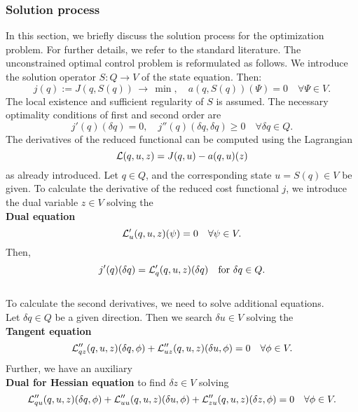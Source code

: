 {\subsubsection{Solution process}
In this section, we briefly discuss the solution process for the 
optimization problem. For further details, we refer to the standard literature.
The unconstrained optimal control problem is reformulated as follows. 
We introduce the solution operator $S:Q\rightarrow V$ of the state equation.
Then:
\begin{equation*}
j(q):= J(q,S(q))\, \rightarrow \, \min , \quad a(q,S(q))(\Psi) = 0 \quad 
\forall \Psi \in V.
\end{equation*}
The local existence and sufficient regularity of $S$ is assumed. The 
necessary optimality conditions of first and second order are
\begin{equation*}
j'(q)(\delta q) = 0 , \quad j''(q)(\delta q,\delta q) \geq 0 \quad 
\forall\delta q\in Q.
\end{equation*} 
The derivatives of the reduced functional can be computed using the 
Lagrangian
\begin{equation*}
{\cal L}(q,u,z) =J(q,u) - a(q,u)(z)
\end{equation*}
as already introduced. Let $q\in Q$, and the corresponding state $u=S(q)\in V$ 
be given. To calculate the derivative of the reduced cost functional $j$, 
we introduce the dual variable
$z\in V$ solving the\\[3mm]
%
\textbf{Dual equation}\\
\begin{equation*}
{\cal L}_u'(q,u,z)(\psi) = 0 \quad\forall\psi\in V.
\end{equation*}
Then,
\begin{equation*}
j'(q)(\delta q) = {\cal L}_q' (q,u,z)(\delta q) \quad \text{for }\delta q\in Q.
\end{equation*}
\\[2mm]
%
To calculate the second derivatives, we need to solve additional equations.\\
%
Let $\delta q\in Q$ be a given direction. Then we search $\delta u\in V$  
solving the\\[2mm]
%
\textbf{Tangent equation}\\
%
\begin{equation*}
{\cal L}_{qz}'' (q,u,z)(\delta q,\phi) + {\cal L}_{uz}'' (q,u,z)(\delta
u,\phi) = 0
\quad\forall \phi\in V.
\end{equation*}
Further, we have an auxiliary\\[2mm]  
%
\textbf{Dual for Hessian equation}
to find $\delta z\in V$ solving
\begin{equation*}
{\cal L}_{qu}'' (q,u,z)(\delta q,\phi) + {\cal L}_{uu}'' 
(q,u,z)(\delta u,\phi) + {\cal L}_{zu}'' (q,u,z)(\delta z,\phi) =0 
\quad\forall \phi\in V.
\end{equation*}

}
